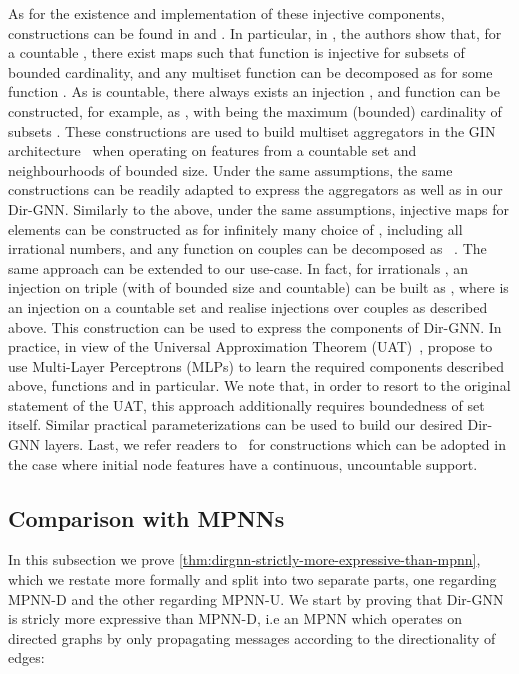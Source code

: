 \documentclass{article}
\newcommand\oursacro{Dir-GNN}
\theoremstyle{plain}
\theoremstyle{definition}
\theoremstyle{remark}
\begin{document}
As for the existence and implementation of these injective components, constructions can be found in \citet{DBLP:conf/iclr/XuHLJ19} and \citet{corso2020principal}.
In particular, in \citep[Lemma 5]{DBLP:conf/iclr/XuHLJ19}, the authors show that, for a countable , there exist maps  such that function  is injective for subsets  of bounded cardinality, and any multiset function  can be decomposed as  for some function . As  is countable, there always exists an injection , and function  can be constructed, for example, as , with  being the maximum (bounded) cardinality of subsets . These constructions are used to build multiset aggregators in the GIN architecture~\citep{DBLP:conf/iclr/XuHLJ19} when operating on features from a countable set and neighbourhoods of bounded size. Under the same assumptions, the same constructions can be readily adapted to express the aggregators  as well as  in our \oursacro{}. 
Similarly to the above, under the same assumptions, injective maps for elements  can be constructed as  for infinitely many choice of , including all irrational numbers, and any function  on couples  can be decomposed as ~\citep[Corollary 6]{DBLP:conf/iclr/XuHLJ19}. The same approach can be extended to our use-case. In fact, for irrationals , an injection on triple  (with  of bounded size and  countable) can be built as , where  is an injection on a countable set and  realise injections over couples  as described above. This construction can be used to express the  components of \oursacro{}. 
In practice, in view of the Universal Approximation Theorem (UAT)~\citep{HORNIK1989359}, \citet{DBLP:conf/iclr/XuHLJ19} propose to use Multi-Layer Perceptrons (MLPs) to learn the required components described above, functions  and  in particular. We note that, in order to resort to the original statement of the UAT, this approach additionally requires boundedness of set  itself. Similar practical parameterizations can be used to build our desired \oursacro{} layers. Last, we refer readers to~\citep{corso2020principal} for constructions which can be adopted in the case where initial node features have a continuous, uncountable support.

\subsection{Comparison with MPNNs}

In this subsection we prove \cref{thm:dirgnn-strictly-more-expressive-than-mpnn}, which we restate more formally and split into two separate parts, one regarding MPNN-D and the other regarding MPNN-U. We start by proving that \oursacro{} is stricly more expressive than MPNN-D, i.e an MPNN which operates on directed graphs by only propagating messages according to the directionality of edges:
\end{document}
